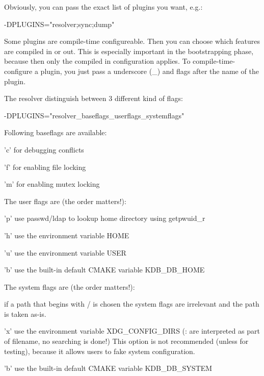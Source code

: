 Obviously, you can pass the exact list of plugins you want, e.\+g.\+: \begin{DoxyVerb}    -DPLUGINS="resolver;sync;dump"
\end{DoxyVerb}


Some plugins are compile-\/time configureable. Then you can choose which features are compiled in or out. This is especially important in the bootstrapping phase, because then only the compiled in configuration applies. To compile-\/time-\/configure a plugin, you just pass a underscore (\+\_\+) and flags after the name of the plugin.

The resolver distinguish between 3 different kind of flags\+: \begin{DoxyVerb}    -DPLUGINS="resolver_baseflags_userflags_systemflags"
\end{DoxyVerb}


Following baseflags are available\+:


\begin{DoxyItemize}
\item 'c' for debugging conflicts
\item 'f' for enabling file locking
\item 'm' for enabling mutex locking
\end{DoxyItemize}

The user flags are (the order matters!)\+:


\begin{DoxyItemize}
\item 'p' use passwd/ldap to lookup home directory using getpwuid\+\_\+r
\item 'h' use the environment variable H\+O\+M\+E
\item 'u' use the environment variable U\+S\+E\+R
\item 'b' use the built-\/in default C\+M\+A\+K\+E variable K\+D\+B\+\_\+\+D\+B\+\_\+\+H\+O\+M\+E
\end{DoxyItemize}

The system flags are (the order matters!)\+:


\begin{DoxyItemize}
\item if a path that begins with / is chosen the system flags are irrelevant and the path is taken as-\/is.
\item 'x' use the environment variable X\+D\+G\+\_\+\+C\+O\+N\+F\+I\+G\+\_\+\+D\+I\+R\+S (\+: are interpreted as part of filename, no searching is done!) This option is not recommended (unless for testing), because it allows users to fake system configuration.
\item 'b' use the built-\/in default C\+M\+A\+K\+E variable K\+D\+B\+\_\+\+D\+B\+\_\+\+S\+Y\+S\+T\+E\+M
\end{DoxyItemize}

